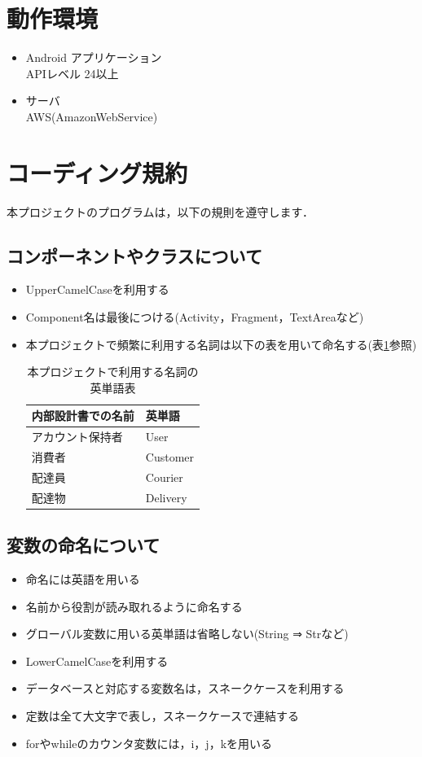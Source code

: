 \documentclass[a4j,titlepage]{jarticle}
\begin{document}
\section{動作環境}
\begin{itemize}
\item Android アプリケーション\\
  APIレベル 24以上
\item サーバ\\
  AWS(AmazonWebService)
\end{itemize}


\section{コーディング規約}
本プロジェクトのプログラムは，以下の規則を遵守します．
\subsection{コンポーネントやクラスについて}
\begin{itemize}
\item UpperCamelCaseを利用する
\item Component名は最後につける(Activity，Fragment，TextAreaなど)
\item 本プロジェクトで頻繁に利用する名詞は以下の表を用いて命名する(表\ref{termTable}参照)
\begin{table}[htb]
\centering
\caption{本プロジェクトで利用する名詞の英単語表}
\label{termTable}
\begin{tabular}{|ll|}
\hline
内部設計書での名前 & 英単語      \\ \hline
アカウント保持者  & User     \\
消費者       & Customer \\
配達員       & Courier  \\
配達物       & Delivery \\ \hline
\end{tabular}
\end{table}
\end{itemize}

\subsection{変数の命名について}
\begin{itemize}
\item 命名には英語を用いる
\item 名前から役割が読み取れるように命名する
\item グローバル変数に用いる英単語は省略しない(String ⇒ Strなど)
\item LowerCamelCaseを利用する
\item データベースと対応する変数名は，スネークケースを利用する
\item 定数は全て大文字で表し，スネークケースで連結する
\item forやwhileのカウンタ変数には，i，j，kを用いる
\end{itemize}
\end{document}
